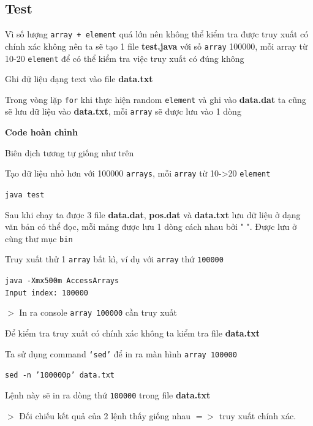 \documentclass[a4paper]{article}
\theoremstyle{definition}
\begin{document}
\subsection{Test}
\item Vì số lượng \texttt{array + element} quá lớn nên không thể kiểm tra được truy xuất có chính xác không nên ta sẽ tạo 1 file \textbf{test.java} với số \texttt{array} 100000, mỗi array từ 10-20 \texttt{element} để có thể kiểm tra việc truy xuất có đúng không
  
  Ghi dữ liệu dạng text vào file \textbf{data.txt}
  
  Trong vòng lặp \texttt{for} khi thực hiện random \texttt{element} và ghi vào \textbf{data.dat} ta cũng sẽ lưu dữ liệu vào \textbf{data.txt}, mỗi \texttt{array} sẽ được lưu vào 1 dòng
  
\textbf{Code hoàn chỉnh}
  
\item Biên dịch tương tự giống như trên
\item Tạo dữ liệu nhỏ hơn với 100000 \texttt{arrays}, mỗi \texttt{array} từ 10->20 \texttt{element}
\begin{mdframed}[backgroundcolor=backcolour, linecolor=backcolour]
  \texttt{java test}
\end{mdframed}
\item Sau khi chạy ta được 3 file \textbf{data.dat}, \textbf{pos.dat} và \textbf{data.txt} lưu dữ liệu ở dạng văn bản có thể đọc, mỗi mảng được lưu 1 dòng cách nhau bởi " ". Được lưu ở cùng thư mục \texttt{bin}
\item Truy xuất thử 1 \texttt{array} bất kì, ví dụ với \texttt{array} thứ \texttt{100000}
\begin{mdframed}[backgroundcolor=backcolour, linecolor=backcolour]
  \texttt{java -Xmx500m AccessArrays\\
    Input index: 100000}
\end{mdframed}
$>$ In ra console \texttt{array 100000} cần truy xuất
\item Để kiểm tra truy xuất có chính xác không ta kiểm tra file \textbf{data.txt}
\item Ta sử dụng command \texttt{`sed'} để in ra màn hình \texttt{array 100000}
\begin{mdframed}[backgroundcolor=backcolour, linecolor=backcolour]
  \texttt{sed -n '100000p' data.txt}
\end{mdframed}
Lệnh này sẽ in ra dòng thứ \texttt{100000} trong file \textbf{data.txt}
\item $>$ Đối chiếu kết quả của 2 lệnh thấy giống nhau $=>$ truy xuất chính xác.
\end{document}
